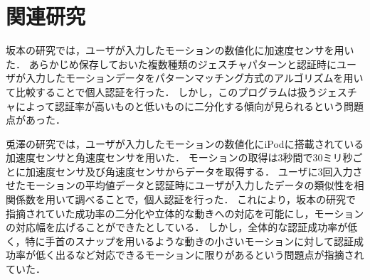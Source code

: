 \section{関連研究}
坂本の研究\cite{sakamoto}では，ユーザが入力したモーションの数値化に加速度センサを用いた．
あらかじめ保存しておいた複数種類のジェスチャパターンと認証時にユーザが入力したモーションデータをパターンマッチング方式のアルゴリズムを用いて比較することで個人認証を行った．
しかし，このプログラムは扱うジェスチャによって認証率が高いものと低いものに二分化する傾向が見られるという問題点があった．

兎澤の研究\cite{tozawa}では，ユーザが入力したモーションの数値化にiPodに搭載されている加速度センサと角速度センサを用いた．
モーションの取得は3秒間で30ミリ秒ごとに加速度センサ及び角速度センサからデータを取得する．
ユーザに3回入力させたモーションの平均値データと認証時にユーザが入力したデータの類似性を相関係数を用いて調べることで，個人認証を行った．
これにより，坂本の研究で指摘されていた成功率の二分化や立体的な動きへの対応を可能にし，モーションの対応幅を広げることができたとしている．
しかし，全体的な認証成功率が低く，特に手首のスナップを用いるような動きの小さいモーションに対して認証成功率が低く出るなど対応できるモーションに限りがあるという問題点が指摘されていた．

